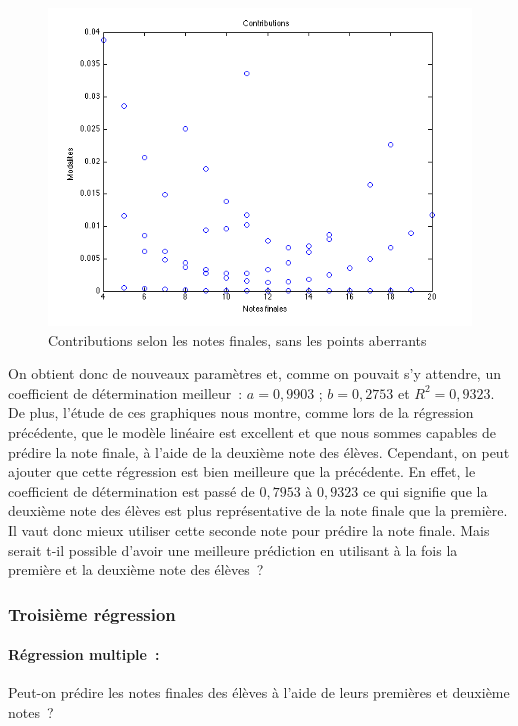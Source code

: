 \documentclass[11pt]{article}
\begin{document}
\begin{figure}[h]
\centering
\includegraphics[scale=0.7]{Images/fig19.png}
\caption{Contributions selon les notes finales, sans les points aberrants}
\end{figure}\FloatBarrier



On obtient donc de nouveaux paramètres et, comme on pouvait s'y attendre, un coefficient de détermination meilleur : $a=0,9903$ ; $b=0,2753$ et  $R^2=0,9323$. De plus, l'étude de ces graphiques nous montre, comme lors de la régression précédente, que le modèle linéaire est excellent et que nous sommes capables de prédire la note finale, à l'aide de la deuxième note des élèves. Cependant, on peut ajouter que cette régression est bien meilleure que la précédente. En effet, le coefficient de détermination est passé de $0,7953$ à $0,9323$ ce qui signifie que la deuxième note des élèves est plus représentative de la note finale que la première. Il vaut donc mieux utiliser cette seconde note pour prédire la note finale. Mais serait t-il possible d'avoir une meilleure prédiction en utilisant à la fois la première et la deuxième note des élèves ?
 
\subsubsection{Troisième régression} 

\paragraph{Régression multiple : } Peut-on prédire les notes finales des élèves à l'aide de leurs premières et deuxième notes ?~\\
\end{document}
